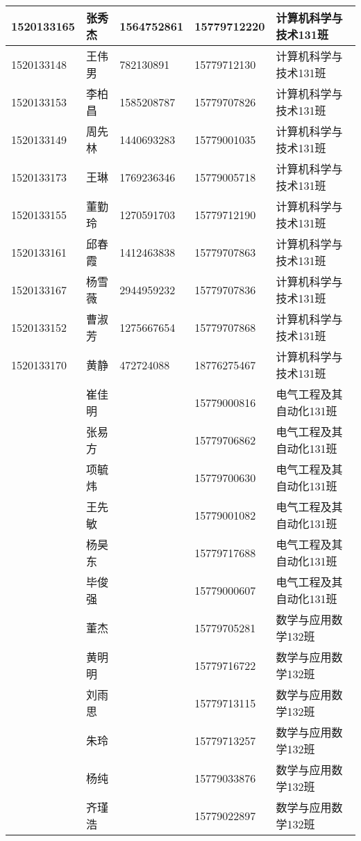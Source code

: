 \documentclass[12pt,a4paper]{article}
\begin{document}
\begin{CJK}{UTF8}{gbsn}
\begin{flushleft}
\begin{longtable}{|l|l|l|l|l|}
1520133165 & 张秀杰 & 1564752861 & 15779712220 & 计算机科学与技术131班 \\ \hline
1520133148 & 王伟男 & 782130891 & 15779712130 & 计算机科学与技术131班 \\ \hline
1520133153 & 李柏昌 & 1585208787 & 15779707826 & 计算机科学与技术131班 \\ \hline
1520133149 & 周先林 & 1440693283 & 15779001035 & 计算机科学与技术131班 \\ \hline
1520133173 & 王琳 & 1769236346 & 15779005718 & 计算机科学与技术131班 \\ \hline
1520133155 & 董勤玲 & 1270591703 & 15779712190 & 计算机科学与技术131班 \\ \hline
1520133161 & 邱春霞 & 1412463838 & 15779707863 & 计算机科学与技术131班 \\ \hline
1520133167 & 杨雪薇 & 2944959232 & 15779707836 & 计算机科学与技术131班 \\ \hline
1520133152 & 曹淑芳 & 1275667654 & 15779707868 & 计算机科学与技术131班 \\ \hline
1520133170 & 黄静 & 472724088 & 18776275467 & 计算机科学与技术131班 \\ \hline


   & 崔佳明 &    & 15779000816 & 电气工程及其自动化131班 \\ \hline
   & 张易方 &    & 15779706862 & 电气工程及其自动化131班 \\ \hline
   & 项毓炜 &    & 15779700630 & 电气工程及其自动化131班 \\ \hline
   & 王先敏 &    & 15779001082 & 电气工程及其自动化131班 \\ \hline
   & 杨昊东 &    & 15779717688 & 电气工程及其自动化131班 \\ \hline
   & 毕俊强 &    & 15779000607 & 电气工程及其自动化131班 \\ \hline

   & 董杰 &    & 15779705281 & 数学与应用数学132班 \\ \hline
   & 黄明明 &    & 15779716722 & 数学与应用数学132班 \\ \hline
   & 刘雨思 &    & 15779713115 & 数学与应用数学132班 \\ \hline
   & 朱玲 &    & 15779713257 & 数学与应用数学132班 \\ \hline
   & 杨纯 &    & 15779033876 & 数学与应用数学132班 \\ \hline
   & 齐瑾浩 &    & 15779022897 & 数学与应用数学132班 \\ \hline


\end{longtable}
\end{flushleft}
\end{CJK}
\end{document}
